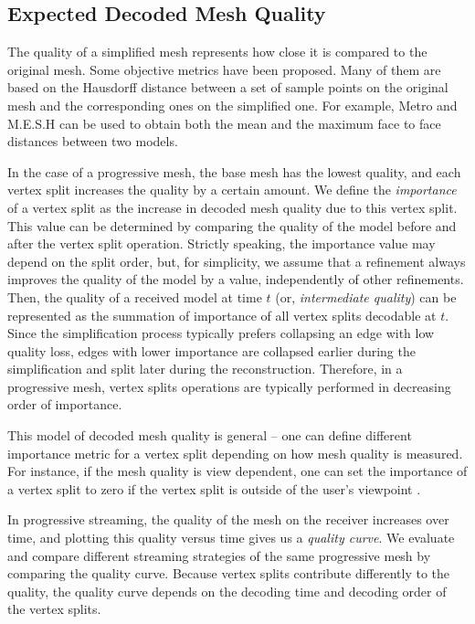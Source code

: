 \subsection{Expected Decoded Mesh Quality}
\label{s:model:analytical_quality}
    The quality of a simplified mesh represents how close it
    is compared to the original mesh. Some objective
    metrics have been proposed. Many of them are based on the
    Hausdorff distance between a set of sample points on the original
    mesh and the corresponding ones on the simplified one.
    For example, Metro \cite{cignoni98metro} and M.E.S.H \cite{mesh:aspert}
    can be used to obtain both the mean and the maximum face to face distances
    between two models.

    In the case of a progressive mesh, the base mesh has the
    lowest quality, and each vertex split increases the
    quality by a certain amount. We define the \textit{importance} of
    a vertex split as the  increase in decoded mesh
    quality due to this vertex split.  
    This value can be determined by comparing the quality
    of the model before and after the vertex split operation.
    Strictly speaking, the importance value may depend on the split order,
    but, for simplicity, we assume that a refinement
    always improves the quality of the model by a value,
    independently of other refinements.  Then, the quality of a
    received model at time $t$ (or, \textit{intermediate
    quality}) can be represented as the summation of
    importance of all vertex splits decodable at $t$.
    Since the simplification process typically prefers collapsing an edge with low
    quality loss, edges with lower importance are collapsed earlier during the
    simplification and split later during the reconstruction.  Therefore, in 
    a progressive mesh, vertex splits operations are typically performed in 
    decreasing order of importance.

    This model of decoded mesh quality is general -- one can
    define different importance metric for a vertex split depending
    on how mesh quality is measured.
    For instance, if the mesh quality is view dependent, one
    can set the importance of a vertex split to zero if the vertex
    split is outside of the user's viewpoint \cite{258843}. 


    In progressive streaming, the quality of the mesh on the receiver
    increases over time, and plotting this quality versus time gives us
    a \emph{quality curve}.  
    We evaluate and compare different streaming strategies 
    of the same progressive mesh by comparing the quality curve.
    Because vertex splits contribute differently
    to the quality, the quality curve depends on the decoding time and decoding order
    of the vertex splits. %
 
